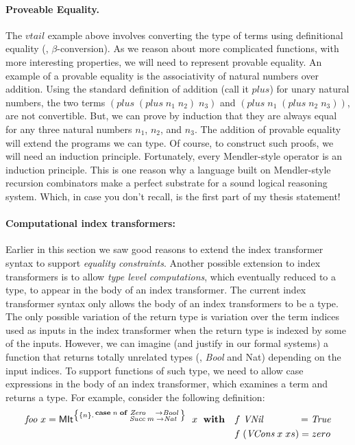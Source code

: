 \paragraph{Proveable Equality.}
The $vtail$ example above involves converting the type of terms using
definitional equality (\ie, $\beta$-conversion). As we reason about more
complicated functions, with more interesting properties, we will need to
represent provable equality. An example of a provable equality is
the associativity of natural numbers over addition. Using the standard
definition of addition (call it $plus$) for unary natural numbers, the two terms
$(plus\;(plus\;n_1\;n_2)\;n_3)$ and $(plus\;n_1\;(plus\;n_2\;n_3))$,
are not convertible. But, we can prove by induction that they are always equal
for any three natural numbers $n_1$, $n_2$, and $n_3$. The addition of
provable equality will extend the programs we can type. Of course,
to construct such proofs, we will need an induction principle. Fortunately,
every Mendler-style operator is an induction principle. This is one reason
why a language built on Mendler-style recursion combinators make a perfect
substrate for a sound logical reasoning system. Which, in case you don't recall,
is the first part of my thesis statement!





\paragraph{Computational index transformers:}
Earlier in this section we saw good reasons to extend
the index transformer syntax to support \emph{equality constraints}.
Another possible extension to index transformers is to allow
\emph{type level computations}, which eventually reduced to a type,
to appear in the body of an index transformer. The current index
transformer syntax only allows the body of an index transformers to be a type.
The only possible variation of the return type is variation over
the term indices used as inputs in the index transformer
when the return type is indexed by some of the inputs. However, we can imagine
(and justify in our formal systems) 
a function that returns totally unrelated types (\eg, \textit{Bool} and Nat)
depending on the input indices. To support functions of such type, we need
to allow case expressions in the body of an index transformer, which examines
a term and returns a type. For example, consider the following definition:
\begin{align*}
\textit{foo}~x =
 \textsf{MIt}^{\left\{\{n\} . \begin{smallmatrix}\textbf{case}\;n\;\textbf{of}
                                        &\textit{Zero}~~~  -> \textit{Bool} \\
                                        &\textit{Succ}\;m\;-> \textit{Nat}\;
                                        \end{smallmatrix}
       \right\}}~\;x~\;\textbf{with}
&\quad  f ~\textit{VNil}~~~~~~~~~~~ = \textit{True} \\
&\quad  f \;(\textit{VCons}\;x\;xs) = zero
\end{align*}

